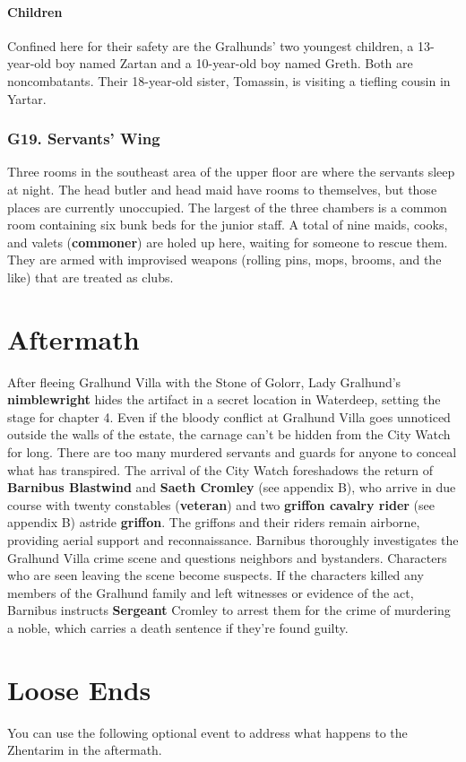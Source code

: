 \documentclass[10pt,a4paper,twoside,twocolumn,openany,nodeprecatedcode]{dndbook}
\begin{document}
\paragraph{Children}
Confined here for their safety are the Gralhunds' two youngest children, a 13-year-old boy named Zartan and a 10-year-old boy named Greth. Both are noncombatants. Their 18-year-old sister, Tomassin, is visiting a tiefling cousin in Yartar.
\subsubsection{G19. Servants' Wing}
Three rooms in the southeast area of the upper floor are where the servants sleep at night. The head butler and head maid have rooms to themselves, but those places are currently unoccupied. The largest of the three chambers is a common room containing six bunk beds for the junior staff. A total of nine maids, cooks, and valets (\textbf{commoner}) are holed up here, waiting for someone to rescue them. They are armed with improvised weapons (rolling pins, mops, brooms, and the like) that are treated as clubs.
\section{Aftermath}
After fleeing Gralhund Villa with the Stone of Golorr, Lady Gralhund's \textbf{nimblewright} hides the artifact in a secret location in Waterdeep, setting the stage for chapter 4.
Even if the bloody conflict at Gralhund Villa goes unnoticed outside the walls of the estate, the carnage can't be hidden from the City Watch for long. There are too many murdered servants and guards for anyone to conceal what has transpired. The arrival of the City Watch foreshadows the return of \textbf{Barnibus Blastwind} and \textbf{Saeth Cromley} (see appendix B), who arrive in due course with twenty constables (\textbf{veteran}) and two \textbf{griffon cavalry rider} (see appendix B) astride \textbf{griffon}. The griffons and their riders remain airborne, providing aerial support and reconnaissance.
Barnibus thoroughly investigates the Gralhund Villa crime scene and questions neighbors and bystanders. Characters who are seen leaving the scene become suspects. If the characters killed any members of the Gralhund family and left witnesses or evidence of the act, Barnibus instructs \textbf{Sergeant} Cromley to arrest them for the crime of murdering a noble, which carries a death sentence if they're found guilty.
\section{Loose Ends}
You can use the following optional event to address what happens to the Zhentarim in the aftermath.
\end{document}

